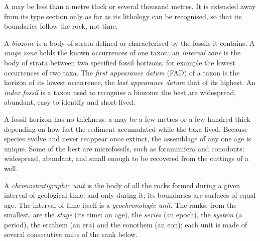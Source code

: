 A  may be less than a metre thick or several thousand metres. It is
extended away from its type section only as far as its lithology can be
recognised, so that its boundaries follow the rock, not time.

\begin{definition}\label{def:b1:stratigraphic-scale:biozone}
A \emph{biozone} is a body of strata defined or characterised by
the fossils it contains. A \emph{range zone} holds the known occurrences of one
taxon; an \emph{interval zone} is the body of strata between two specified
fossil horizons, for example the lowest occurrences of two taxa. The
\emph{first appearance datum} (FAD) of a taxon is
the horizon of its lowest occurrence, the \emph{last appearance
datum} that of
its highest. An \emph{index fossil} is a taxon used to
recognise a biozone: the best are widespread, abundant, easy to identify and
short-lived.
\end{definition}

A fossil horizon has no thickness; a  may be a few metres or a few hundred
thick depending on how fast the sediment accumulated while the taxa lived.
Because species evolve and never reappear once extinct, the assemblage of any one
age is unique. Some of the best  are microfossils, such as
foraminifera and conodonts: widespread, abundant, and small enough to be
recovered from the cuttings of a well.

\begin{definition}\label{def:b1:stratigraphic-scale:chronostratigraphy}
A \emph{chronostratigraphic unit} is the body of
all the rocks formed during a given interval of geological time, and only during
it; its boundaries are surfaces of equal age. The interval of time itself is a
\emph{geochronologic unit}. The ranks, from the
smallest, are the \emph{stage} (its time:
an age), the \emph{series} (an epoch), the
\emph{system} (a period), the erathem (an
era) and the eonothem (an eon); each unit is made of several consecutive units of
the rank below.
\end{definition}

